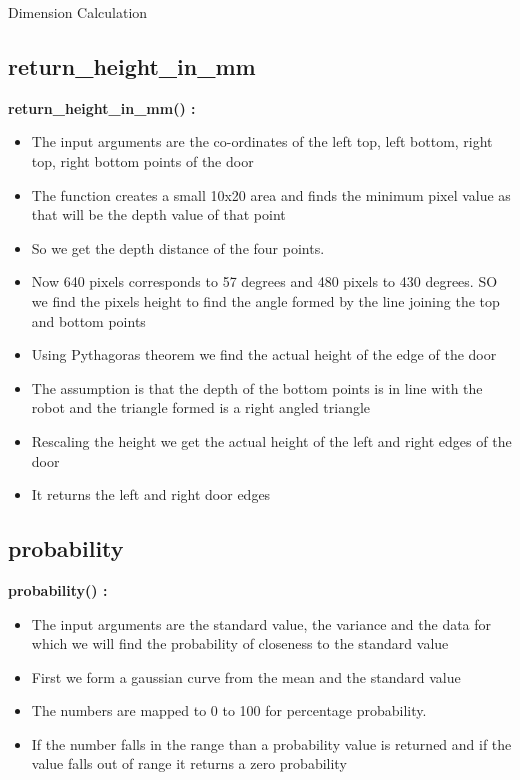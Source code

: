 \documentclass[10pt, a4paper]{beamer}
\begin{document}
\begin{frame}[allowframebreaks]{Dimension Calculation}
    \subsection{return\_height\_in\_mm}
      \textbf{return\_height\_in\_mm() : }
	\begin{itemize}
       \item The input arguments are the co-ordinates of the left top, left bottom, right top, right bottom points of the door
       \item The function creates a small 10x20 area and finds the minimum pixel value as that will be the depth value of that point
       \item So we get the depth distance of the four points.
       \item Now 640 pixels corresponds to 57 degrees and 480 pixels to 430 degrees. SO we find the pixels height to find the angle formed by the line joining the top and bottom points
       \item Using Pythagoras theorem we find the actual height of the edge of the door
       \item The assumption is that the depth of the bottom points is in line with the robot and the triangle formed is a right angled triangle
       \item Rescaling the height we get the actual height of the left and right edges of the door
       \item It returns the left and right door edges
	\end{itemize}
  \framebreak
    \subsection{probability}
      \textbf{probability() : }
	\begin{itemize}
	 \item The input arguments are the standard value, the variance and the data for which we will find the probability of closeness to the standard value
	 \item First we form a gaussian curve from the mean and the standard value
	 \item The numbers are mapped to 0 to 100 for percentage probability.
	 \item If the number falls in the range than a probability value is returned and if the value falls out of range it returns a zero probability
	\end{itemize}
\end{frame}
\end{document}
